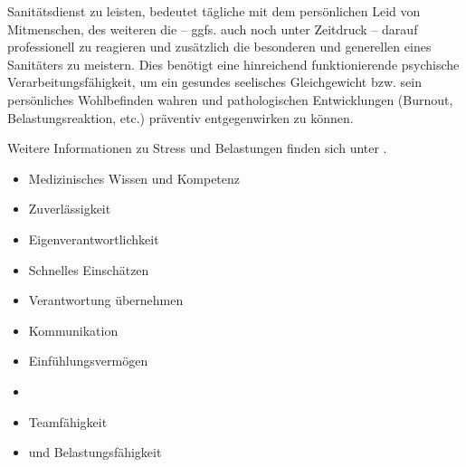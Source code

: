 {Sanitätsdienst zu leisten, bedeutet tägliche
 mit dem persönlichen Leid von Mitmenschen,
des weiteren die  – ggfs. auch noch
unter Zeitdruck – darauf professionell zu reagieren und
zusätzlich die besonderen und generellen  eines Sanitäters zu meistern. Dies
benötigt eine hinreichend funktionierende psychische
Verarbeitungsfähigkeit, um ein gesundes seelisches
Gleichgewicht bzw. sein persönliches Wohlbefinden wahren und
pathologischen Entwicklungen (Burnout, Belastungsreaktion,
etc.) präventiv entgegenwirken zu können.

Weitere Informationen zu Stress und Belastungen finden sich
unter . 

}{%
\begin{itemize}
  \item Medizinisches Wissen und Kompetenz
  \item Zuverlässigkeit
  \item Eigenverantwortlichkeit
  \item Schnelles Einschätzen
  \item Verantwortung übernehmen
  \item Kommunikation
  \item Einfühlungsvermögen
  \item {}
  \item Teamfähigkeit
  \item {} und  Belastungsfähigkeit
\end{itemize}
}{}{}{}



